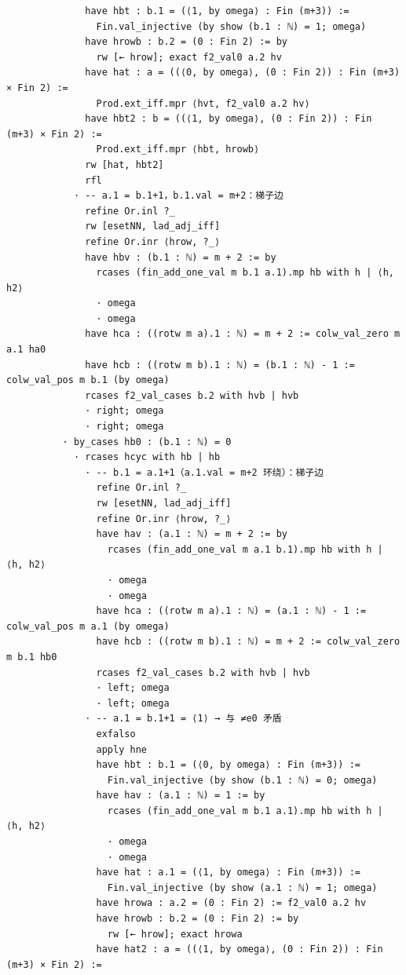 \documentclass[11pt]{article}
\begin{document}
\begin{lstlisting}
              have hbt : b.1 = (⟨1, by omega⟩ : Fin (m+3)) :=
                Fin.val_injective (by show (b.1 : ℕ) = 1; omega)
              have hrowb : b.2 = (0 : Fin 2) := by
                rw [← hrow]; exact f2_val0 a.2 hv
              have hat : a = ((⟨0, by omega⟩, (0 : Fin 2)) : Fin (m+3) × Fin 2) :=
                Prod.ext_iff.mpr ⟨hvt, f2_val0 a.2 hv⟩
              have hbt2 : b = ((⟨1, by omega⟩, (0 : Fin 2)) : Fin (m+3) × Fin 2) :=
                Prod.ext_iff.mpr ⟨hbt, hrowb⟩
              rw [hat, hbt2]
              rfl
            · -- a.1 = b.1+1，b.1.val = m+2：梯子边
              refine Or.inl ?_
              rw [esetNN, lad_adj_iff]
              refine Or.inr ⟨hrow, ?_⟩
              have hbv : (b.1 : ℕ) = m + 2 := by
                rcases (fin_add_one_val m b.1 a.1).mp hb with h | ⟨h, h2⟩
                · omega
                · omega
              have hca : ((rotw m a).1 : ℕ) = m + 2 := colw_val_zero m a.1 ha0
              have hcb : ((rotw m b).1 : ℕ) = (b.1 : ℕ) - 1 := colw_val_pos m b.1 (by omega)
              rcases f2_val_cases b.2 with hvb | hvb
              · right; omega
              · right; omega
          · by_cases hb0 : (b.1 : ℕ) = 0
            · rcases hcyc with hb | hb
              · -- b.1 = a.1+1（a.1.val = m+2 环绕）：梯子边
                refine Or.inl ?_
                rw [esetNN, lad_adj_iff]
                refine Or.inr ⟨hrow, ?_⟩
                have hav : (a.1 : ℕ) = m + 2 := by
                  rcases (fin_add_one_val m a.1 b.1).mp hb with h | ⟨h, h2⟩
                  · omega
                  · omega
                have hca : ((rotw m a).1 : ℕ) = (a.1 : ℕ) - 1 := colw_val_pos m a.1 (by omega)
                have hcb : ((rotw m b).1 : ℕ) = m + 2 := colw_val_zero m b.1 hb0
                rcases f2_val_cases b.2 with hvb | hvb
                · left; omega
                · left; omega
              · -- a.1 = b.1+1 = ⟨1⟩ → 与 ≠e0 矛盾
                exfalso
                apply hne
                have hbt : b.1 = (⟨0, by omega⟩ : Fin (m+3)) :=
                  Fin.val_injective (by show (b.1 : ℕ) = 0; omega)
                have hav : (a.1 : ℕ) = 1 := by
                  rcases (fin_add_one_val m b.1 a.1).mp hb with h | ⟨h, h2⟩
                  · omega
                  · omega
                have hat : a.1 = (⟨1, by omega⟩ : Fin (m+3)) :=
                  Fin.val_injective (by show (a.1 : ℕ) = 1; omega)
                have hrowa : a.2 = (0 : Fin 2) := f2_val0 a.2 hv
                have hrowb : b.2 = (0 : Fin 2) := by
                  rw [← hrow]; exact hrowa
                have hat2 : a = ((⟨1, by omega⟩, (0 : Fin 2)) : Fin (m+3) × Fin 2) :=

\end{lstlisting}
\end{document}
